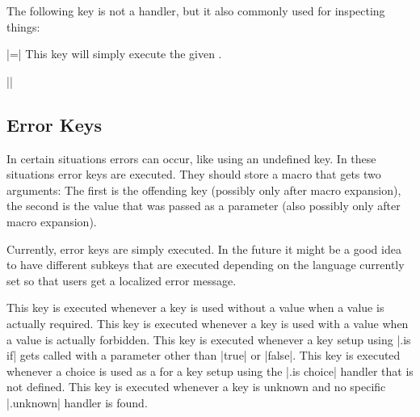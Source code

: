 The following key is not a handler, but it also commonly used for
inspecting things:
\begin{itemize}
  |=|
  This key will simply execute the given . 

  \example ||
\end{itemize}


\subsection{Error Keys}

In certain situations errors can occur, like using an undefined
key. In these situations error keys are executed. They should store a
macro that gets two arguments: The first is the offending key
(possibly only after macro expansion), the second is the value that
was passed as a parameter (also possibly only after macro expansion).

Currently, error keys are simply executed. In the future it might be a
good idea to have different subkeys that are executed depending on the
language currently set so that users get a localized error message.

\begin{itemize}
   This key is executed whenever a
  key is used without a value when a value is actually required.
   This key is executed whenever a
  key is used with a value when a value is actually forbidden.
   This key is executed whenever a
  key setup using |.is if| gets called with a parameter other than
  |true| or |false|.
   This key is executed
  whenever a choice is used as a  for a key setup using
  the |.is choice| handler that is not defined.
   This key is executed
  whenever a key is unknown and no specific |.unknown| handler is found. 
\end{itemize}